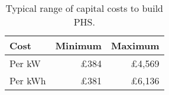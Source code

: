 \begin{table}[htbp]
	\caption{Typical range of capital costs to build PHS.}
	\label{tbl:costs_kW_kWh}
	\centering
	\begin{tabular}{@{}lrr@{}}
		\toprule
		Cost & Minimum & Maximum \\ \midrule
		Per kW & £384 & £4,569 \\
		Per kWh & £381 & £6,136 \\ \bottomrule
	\end{tabular}
\end{table}